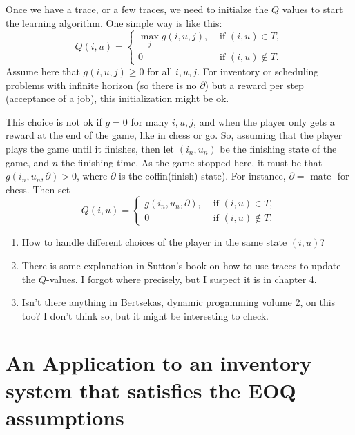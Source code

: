 \documentclass{article}
\begin{document}
Once we have a trace, or a few traces, we need to initialze the $Q$ values to start the learning algorithm. One simple way is like this: 
\begin{equation*}
  Q(i,u) = 
  \begin{cases}
    \max_j g(i,u,j),  &\text{ if } (i,u) \in T, \\
    0  &\text{ if } (i,u) \not \in T.
  \end{cases}
\end{equation*}
Assume here that $g(i,u,j)\geq 0$ for all $i, u, j$.  For inventory or scheduling problems with infinite horizon (so there is no $\partial$) but a reward per step (acceptance of a job), this initialization might be ok. 

This choice is not ok if $g=0$ for many $i,u,j$, and when the player only gets a reward at the end of the game, like in chess or go. So, assuming that the player plays the game until it finishes,  then let $(i_n, u_n)$ be the finishing  state of the game, and $n$ the finishing time. As the game stopped here, it must be that $g(i_n, u_n, \partial)>0$, where $\partial$ is the coffin(finish) state). For instance, $\partial = \text{ mate }$ for chess. Then set 
\begin{equation*}
  Q(i,u) = 
  \begin{cases}
    g(i_n,u_n,\partial),  &\text{ if } (i,u) \in T, \\
    0  &\text{ if } (i,u) \not \in T.
  \end{cases}
\end{equation*}





\begin{enumerate}
\item How to handle different choices of the player in the same state $(i,u)$? 
\item There is some explanation in Sutton's book on how to use traces to update the $Q$-values. I forgot where precisely, but I suspect it is in chapter 4.
\item Isn't there anything in Bertsekas, dynamic progamming volume 2,  on this too? I don't think so, but it might be interesting to check.
\end{enumerate}


\section{An Application to an inventory system that satisfies the EOQ assumptions}
\end{document}
